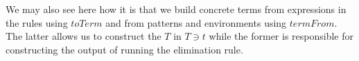 We may also see here how it is that we build concrete terms from
expressions in the rules using $toTerm$ and from patterns and
environments using $termFrom$. The latter allows us to construct
the $T$ in $T ∋ t$ while the former is responsible for constructing
the output of running the elimination rule.

\begin{code}%
\>[0]%
\>[11]\AgdaSymbol{:}%
\>[14]\AgdaSpace{}%
%
\>[43]\<%
\\
%
\>[14]%
\>[43]\<%
\\
%
\>[14]\AgdaSymbol{(}\AgdaSpace{}%
\AgdaSymbol{:}\AgdaSpace{}%
\AgdaSymbol{)}%
\>[43]\<%
\\
%
\>[14]\AgdaSymbol{((}\AgdaSpace{}%
\AgdaSpace{}%
\AgdaSymbol{(}\AgdaSpace{}%
\AgdaSymbol{))}\AgdaSpace{}%
\AgdaSymbol{)}%
\>[43]\<%
\\
%
\>[14]\AgdaSymbol{((}\AgdaSpace{}%
\AgdaSpace{}%
\AgdaSymbol{(}\AgdaSpace{}%
\AgdaSymbol{))}\AgdaSpace{}%
\AgdaSymbol{)}%
\>[43]\<%
\\
%
\>[14]\AgdaSpace{}%
\<%
\\
\>[0]\AgdaSpace{}%
\AgdaSymbol{\{}\AgdaSymbol{\}}\AgdaSpace{}%
\AgdaSpace{}%
\AgdaSpace{}%
\AgdaSpace{}%
\AgdaSpace{}%
\AgdaSpace{}%
\AgdaSymbol{)}\AgdaSpace{}%
\AgdaSpace{}%
\AgdaSpace{}%
\<%
\\
\>[0][@{}l@{\AgdaIndent{0}}]%
\>[2]\AgdaSymbol{=}%
\>[527I]\<%
\\
\>[527I][@{}l@{\AgdaIndent{0}}]%
\>[5]\AgdaSymbol{\AgdaUnderscore{}}\AgdaSpace{}%
\AgdaSpace{}%
%
\>[530I]\AgdaSpace{}%
\AgdaSpace{}%
\<%
\\
\>[.][@{}l@{}]\<[530I]%
\>[20]\AgdaSymbol{(}\AgdaSpace{}%
\AgdaSymbol{(}\AgdaSpace{}%
\AgdaSymbol{)}\AgdaSpace{}%

\end{code}
